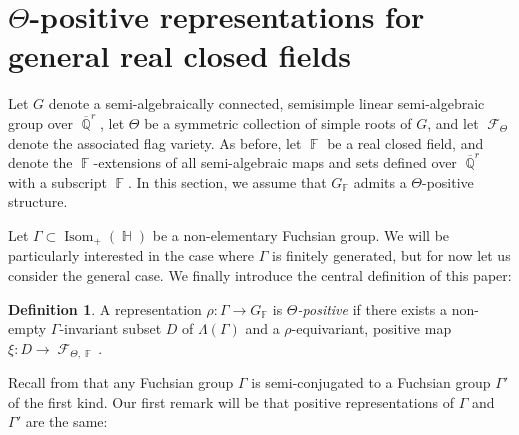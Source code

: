 \documentclass{amsart}
\theoremstyle{plain}
\theoremstyle{definition}
\newtheorem{definition}[proposition]{Definition}
\DeclareMathOperator{\Isom}{Isom}
\DeclareMathOperator{\Fc}{\mathcal{F}}
\DeclareMathOperator{\Fb}{{\mathbb{F}}}
\DeclareMathOperator{\Hb}{\mathbb{H}}
\DeclareMathOperator{\Qb}{\mathbb{Q}}
\newcommand*\from{\colon}
\newcommand{\1}{\mathbf{1}}
\begin{document}
\section{%
\texorpdfstring{%
$\Theta$-positive representations for general real closed fields}%
{Theta-positive representations for general real closed fields}}
\label{s: Definitions Positive representations}


Let $G$ denote a semi-algebraically connected, semisimple linear semi-algebraic group over $\overline{\Qb}^r$, let $\Theta$ be a symmetric collection of simple roots of $G$, and let $\Fc_{\Theta}$ denote the associated flag variety. As before, let $\Fb$ be a real closed field, and denote the $\Fb$-extensions of all semi-algebraic maps and sets defined over $\overline{\Qb}^r$ with a subscript $\Fb$. In this section, we assume that $G_{\Fb}$ admits a $\Theta$-positive structure.

Let $\Gamma\subset \Isom_+(\Hb)$ be a non-elementary Fuchsian group.
We will be particularly interested in the case where $\Gamma$ is finitely generated, but for now let us consider the general case. We finally introduce the central definition of this paper: 

\begin{definition}\label{dfn: positive representations}
    A representation $\rho \from \Gamma\to G_{\Fb}$ is \emph{$\Theta$-positive} if there exists a non-empty $\Gamma$-invariant subset $D$ of $\Lambda(\Gamma)$ and a $\rho$-equivariant, positive map $\xi \from D \to \Fc_{\Theta,\Fb}$.
\end{definition}

Recall from  that any Fuchsian group $\Gamma$ is semi-conjugated to a Fuchsian group $\Gamma'$ of the first kind. Our first remark will be that positive representations of $\Gamma$ and $\Gamma'$ are the same:
\end{document}
